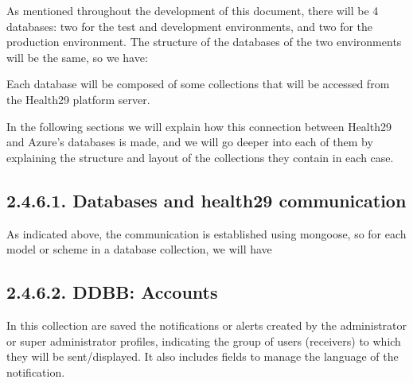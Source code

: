 \documentclass[letterpaper,10pt,english]{sphinxmanual}
\begin{document}
As mentioned throughout the development of this document, there will be 4 databases: two for the test and development environments, and two for the production environment.
The structure of the databases of the two environments will be the same, so we have:



Each database will be composed of some collections that will be accessed from the Health29 platform server.

In the following sections we will explain how this connection between Health29 and Azure’s databases is made, and we will go deeper into each of them by explaining the structure and layout of the collections they contain in each case.


\subsection{2.4.6.1. Databases and health29 communication}
\label{\detokenize{pages/SW/Code:databases-and-health29-communication}}
As indicated above, the communication is established using mongoose, so for each model or scheme in a database collection, we will have

\begin{sphinxVerbatim}[commandchars=\\\{\}]
    
     

\PYG{p}{[}\PYG{p}{]}  

    
\end{sphinxVerbatim}


\subsection{2.4.6.2. DDBB: Accounts}
\label{\detokenize{pages/SW/Code:ddbb-accounts}}
In this collection are saved the notifications or alerts created by the administrator or super administrator profiles, indicating the group of users (receivers) to which they will be sent/displayed. It also includes fields to manage the language of the notification.
\end{document}

